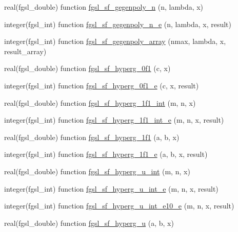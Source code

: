 \begin{DoxyCompactItemize}
\item 
real(fgsl\-\_\-double) function \hyperlink{specfunc_8finc_a877dc1a2a3dfef5095b7d1ecea26148d}{fgsl\-\_\-sf\-\_\-gegenpoly\-\_\-n} (n, lambda, x)
\item 
integer(fgsl\-\_\-int) function \hyperlink{specfunc_8finc_a12853ef98eefd27714b71133da5b7c20}{fgsl\-\_\-sf\-\_\-gegenpoly\-\_\-n\-\_\-e} (n, lambda, x, result)
\item 
integer(fgsl\-\_\-int) function \hyperlink{specfunc_8finc_a0c3d64b3d72b596617ab4cb81676155c}{fgsl\-\_\-sf\-\_\-gegenpoly\-\_\-array} (nmax, lambda, x, result\-\_\-array)
\item 
real(fgsl\-\_\-double) function \hyperlink{specfunc_8finc_ab35818a0e5fc4a0a82aa9fba39555bc9}{fgsl\-\_\-sf\-\_\-hyperg\-\_\-0f1} (c, x)
\item 
integer(fgsl\-\_\-int) function \hyperlink{specfunc_8finc_a07945fd0ca236c371ebcfd276b4fa79e}{fgsl\-\_\-sf\-\_\-hyperg\-\_\-0f1\-\_\-e} (c, x, result)
\item 
real(fgsl\-\_\-double) function \hyperlink{specfunc_8finc_a27fb68a134070920937fea3f8a9d4a5a}{fgsl\-\_\-sf\-\_\-hyperg\-\_\-1f1\-\_\-int} (m, n, x)
\item 
integer(fgsl\-\_\-int) function \hyperlink{specfunc_8finc_a3fdaf30a4ab2665297ec2062b509a847}{fgsl\-\_\-sf\-\_\-hyperg\-\_\-1f1\-\_\-int\-\_\-e} (m, n, x, result)
\item 
real(fgsl\-\_\-double) function \hyperlink{specfunc_8finc_a5c5a56079183e6da71e9d512ff325ba9}{fgsl\-\_\-sf\-\_\-hyperg\-\_\-1f1} (a, b, x)
\item 
integer(fgsl\-\_\-int) function \hyperlink{specfunc_8finc_a1654064106d18ac64d8bd8c77c3e8797}{fgsl\-\_\-sf\-\_\-hyperg\-\_\-1f1\-\_\-e} (a, b, x, result)
\item 
real(fgsl\-\_\-double) function \hyperlink{specfunc_8finc_ab4ff7b25632e1df2e941b857d3b3345d}{fgsl\-\_\-sf\-\_\-hyperg\-\_\-u\-\_\-int} (m, n, x)
\item 
integer(fgsl\-\_\-int) function \hyperlink{specfunc_8finc_ae52effddd477a734a5228e61d6b52cd6}{fgsl\-\_\-sf\-\_\-hyperg\-\_\-u\-\_\-int\-\_\-e} (m, n, x, result)
\item 
integer(fgsl\-\_\-int) function \hyperlink{specfunc_8finc_aba822c9be62292db8b3571bb22345e23}{fgsl\-\_\-sf\-\_\-hyperg\-\_\-u\-\_\-int\-\_\-e10\-\_\-e} (m, n, x, result)
\item 
real(fgsl\-\_\-double) function \hyperlink{specfunc_8finc_ae25339fd752554a568356d5fe08c3d91}{fgsl\-\_\-sf\-\_\-hyperg\-\_\-u} (a, b, x)
\item 

\end{DoxyCompactItemize}
